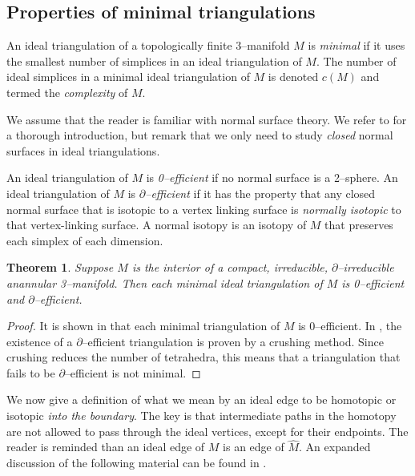 \documentclass[a4paper]{gtart}
\def\manifold{M}
\theoremstyle{plain}
\newtheorem{theorem}{Theorem}%
\theoremstyle{definition}
\theoremstyle{remark}
\numberwithin{equation}{section}
\begin{document}

\subsection{Properties of minimal triangulations}

An ideal triangulation of a topologically finite 3--manifold $\manifold$ is \emph{minimal} if it uses the smallest number of simplices in an ideal triangulation of $\manifold .$ The number of ideal simplices in a minimal ideal triangulation of $\manifold$ is denoted $c(\manifold)$ and termed the \emph{complexity} of $\manifold .$

We assume that the reader is familiar with normal surface theory. We refer to \cite{Tillmann-normal-2008} for a thorough introduction, but remark that we only need to study \emph{closed} normal surfaces in ideal triangulations.

An ideal triangulation of $\manifold$ is \emph{0--efficient} if no normal surface is a 2--sphere.  An ideal triangulation of $\manifold$ is \emph{$\partial$--efficient} if it has the property that any closed normal surface that is isotopic to a vertex linking surface is \emph{normally isotopic} to that vertex-linking surface. A normal isotopy is an isotopy of $\manifold$ that preserves each simplex of each dimension. 

\begin{theorem}\label{lem:bdEfficient} 
Suppose $\manifold$ is the interior of a compact, irreducible, $\partial$--irreducible anannular 3--manifold. Then each minimal ideal triangulation of $\manifold$ is 0--efficient and $\partial$--efficient.
\end{theorem}

\begin{proof}
It is shown in \cite[Corollary 7.3]{Jaco-0-efficient-2003} that each minimal triangulation of $\manifold$ is 0--efficient. 
In \cite[Theorem 4.7]{Jaco-annular-2011}, the existence of a $\partial$--efficient triangulation is proven by a crushing method. Since crushing reduces the number of tetrahedra, this means that a triangulation that fails to be $\partial$--efficient is not minimal.
\end{proof}

We now give a definition of what we mean by an ideal edge to be homotopic or isotopic \emph{into the boundary}. The key is that intermediate paths in the homotopy are not allowed to pass through the ideal vertices, except for their endpoints. The reader is reminded than an ideal edge of $\manifold$ is an edge of $\widehat{\manifold}.$ An expanded discussion of the following material can be found in \cite{Hodgson-triangulations-2015}.
\end{document}
